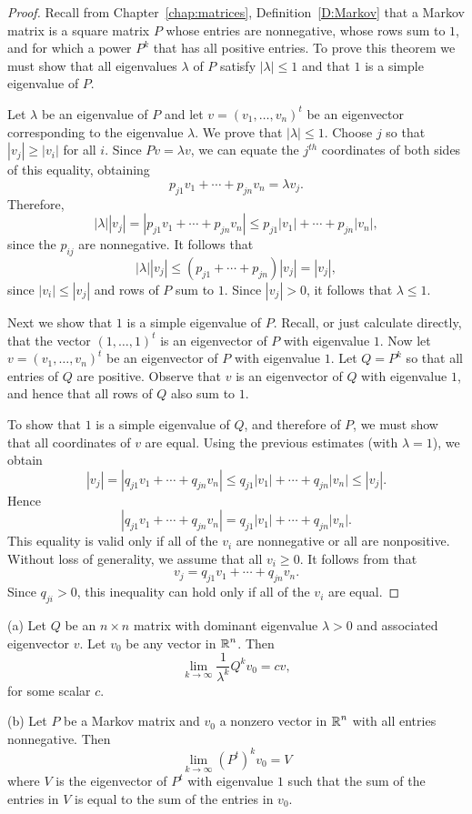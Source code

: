 \documentclass{ximera}
\begin{document}
\begin{proof}  Recall from Chapter~\ref{chap:matrices}, Definition~\ref{D:Markov} 
that a Markov matrix is a square matrix $P$ whose entries are nonnegative, 
whose rows sum to $1$, and for which a power $P^k$ that has all positive 
entries.  To prove this theorem we must show that all eigenvalues $\lambda$ 
of $P$ satisfy $|\lambda|\leq 1$ and that $1$ is a simple eigenvalue of $P$.

Let $\lambda$ be an eigenvalue of $P$ and let $v=(v_1,\ldots,v_n)^t$ be an 
eigenvector corresponding to the eigenvalue $\lambda$.  We prove that 
$|\lambda|\leq 1$.  Choose $j$ so that $|v_j|\ge|v_i|$ for all $i$.  Since 
$Pv=\lambda v$, we can equate the $j^{th}$ coordinates of both sides of 
this equality, obtaining
\[
p_{j1}v_1 + \cdots + p_{jn}v_n = \lambda v_j.
\]
Therefore,
\[
 |\lambda| |v_j| = |p_{j1}v_1 + \cdots + p_{jn}v_n| \leq 
p_{j1}|v_1| + \cdots + p_{jn}|v_n|,
\]
since the $p_{ij}$ are nonnegative.  It follows that 
\[
|\lambda| |v_j| \leq (p_{j1}+\cdots+p_{jn})|v_j| =|v_j|,
\]
since $|v_i|\le|v_j|$ and rows of $P$ sum to $1$.  Since $|v_j|>0$, it 
follows that $\lambda\leq 1$.

Next we show that $1$ is a simple eigenvalue of $P$.  Recall, or just 
calculate directly, that the vector $(1,\ldots,1)^t$ is an eigenvector of $P$ 
with eigenvalue $1$.  Now let $v=(v_1,\ldots,v_n)^t$ be an eigenvector of $P$ 
with eigenvalue $1$.  Let $Q=P^k$ so that all entries of $Q$ are positive. 
Observe that $v$ is an eigenvector of $Q$ with eigenvalue $1$, and hence that 
all rows of $Q$ also sum to $1$.

To show that $1$ is a simple eigenvalue of $Q$, and therefore of $P$, we must 
show that all coordinates of $v$ are equal.  Using the previous estimates 
(with $\lambda=1$), we obtain 
\begin{equation}  \label{E:ineqM}
|v_j|= |q_{j1}v_1 + \cdots + q_{jn}v_n| \leq  q_{j1}|v_1| + \cdots + 
q_{jn}|v_n| \leq |v_j|.
\end{equation}
Hence 
\[
|q_{j1}v_1 + \cdots + q_{jn}v_n| =  q_{j1}|v_1| + \cdots + q_{jn}|v_n|.
\]
This equality is valid only if all of the $v_i$ are nonnegative or all are 
nonpositive.  Without loss of generality, we assume that all $v_i\geq 0$.
It follows from  that 
\[
v_j= q_{j1}v_1 + \cdots + q_{jn}v_n.
\]
Since $q_{ji}>0$, this inequality can hold only if all of the $v_i$ are
equal.  \end{proof}


\begin{theorem} \label{T:convergetoeig}
(a)  Let $Q$ be an $n\times n$ matrix with dominant eigenvalue 
$\lambda>0$ and associated eigenvector $v$.  Let $v_0$ be any vector in 
$\mbox{$\Bbb{R}$}^n$.  Then
\[
\lim_{k\to\infty}\frac{1}{\lambda^k}Q^kv_0 = cv,
\]
for some scalar $c$.

(b)  Let $P$ be a Markov matrix and $v_0$ a nonzero vector in $\mbox{$\Bbb{R}$}^n$
with all entries nonnegative.  Then 
\[
\lim_{k\to\infty}(P^t)^kv_0 = V
\]
where $V$ is the eigenvector of $P^t$ with eigenvalue $1$ such that the 
sum of the entries in $V$ is equal to the sum of the entries in $v_0$.
\end{theorem} 
\end{document}
